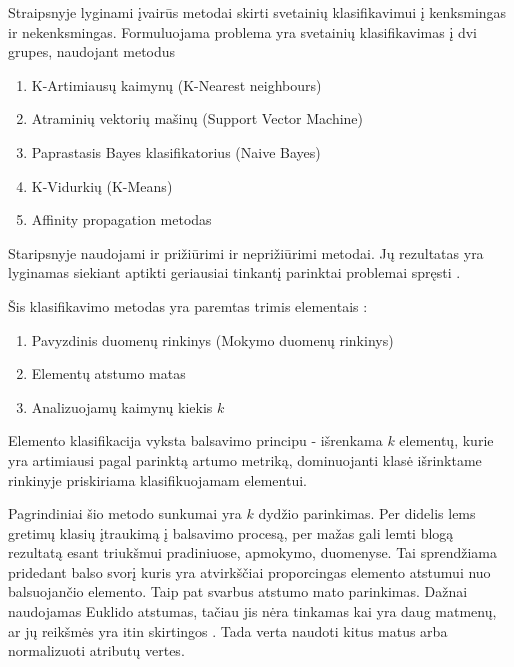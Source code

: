 
Straipsnyje lyginami įvairūs metodai skirti svetainių klasifikavimui į kenksmingas ir nekenksmingas.
Formuluojama problema yra svetainių klasifikavimas į dvi grupes, naudojant metodus \cite{comp}
\begin{enumerate}
 \item K-Artimiausų kaimynų (K-Nearest neighbours)
 \item Atraminių vektorių mašinų (Support Vector Machine)
 \item Paprastasis Bayes klasifikatorius (Naive Bayes)
 \item K-Vidurkių (K-Means)
 \item Affinity propagation metodas
\end{enumerate}


Staripsnyje naudojami ir prižiūrimi ir neprižiūrimi metodai. Jų rezultatas yra lyginamas siekiant aptikti geriausiai tinkantį parinktai problemai spręsti \cite{comp}.

Šis klasifikavimo metodas yra paremtas trimis elementais \cite{Wu2008}:
\begin{enumerate}
    \item Pavyzdinis duomenų rinkinys (Mokymo duomenų rinkinys)
    \item Elementų atstumo matas
    \item Analizuojamų kaimynų kiekis $k$
\end{enumerate}
Elemento klasifikacija vyksta balsavimo principu - išrenkama $k$ elementų, kurie yra artimiausi pagal parinktą artumo metriką, dominuojanti klasė išrinktame rinkinyje priskiriama klasifikuojamam elementui.

Pagrindiniai šio metodo sunkumai yra $k$ dydžio parinkimas. Per didelis lems gretimų klasių įtraukimą į balsavimo procesą, per mažas gali lemti blogą rezultatą esant triukšmui pradiniuose, apmokymo, duomenyse. Tai sprendžiama pridedant balso svorį \cite{Wu2008} kuris yra atvirkščiai proporcingas elemento atstumui nuo balsuojančio elemento. Taip pat svarbus atstumo mato parinkimas. Dažnai naudojamas Euklido atstumas, tačiau jis nėra tinkamas kai yra daug matmenų, ar jų reikšmės yra itin skirtingos \cite{Wu2008}. Tada verta naudoti kitus matus arba normalizuoti atributų vertes.

